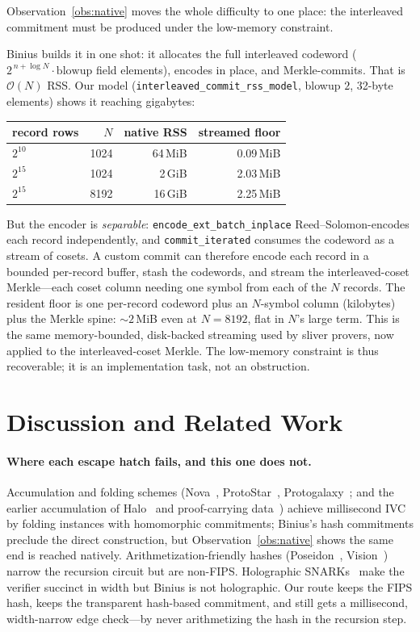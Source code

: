 \documentclass[11pt]{article}
\newcommand{\bigO}{\mathcal{O}}
\begin{document}
Observation~\ref{obs:native} moves the whole difficulty to one place: the
interleaved commitment must be produced under the low-memory constraint.

Binius builds it in one shot: it allocates the full interleaved codeword
($2^{\,n+\log N}\!\cdot\!\text{blowup}$ field elements), encodes in place, and
Merkle-commits. That is $\bigO(N)$ RSS. Our model
(\texttt{interleaved\_commit\_rss\_model}, blowup $2$, 32-byte elements) shows it
reaching gigabytes:

\begin{center}
\begin{tabular}{lrrr}
\toprule
record rows & $N$ & native RSS & streamed floor\\
\midrule
$2^{10}$ & 1024 & 64\,MiB & 0.09\,MiB\\
$2^{15}$ & 1024 & 2\,GiB  & 2.03\,MiB\\
$2^{15}$ & 8192 & 16\,GiB & 2.25\,MiB\\
\bottomrule
\end{tabular}
\end{center}

But the encoder is \emph{separable}: \texttt{encode\_ext\_batch\_inplace}
Reed--Solomon-encodes each record independently, and \texttt{commit\_iterated}
consumes the codeword as a stream of cosets. A custom commit can therefore encode
each record in a bounded per-record buffer, stash the codewords, and stream the
interleaved-coset Merkle---each coset column needing one symbol from each of the
$N$ records. The resident floor is one per-record codeword plus an $N$-symbol
column (kilobytes) plus the Merkle spine: $\sim2$\,MiB even at $N=8192$, flat in
$N$'s large term. This is the same memory-bounded, disk-backed streaming used by
sliver provers, now applied to the interleaved-coset Merkle. The low-memory
constraint is thus recoverable; it is an implementation task, not an obstruction.

\section{Discussion and Related Work}

\paragraph{Where each escape hatch fails, and this one does not.}
Accumulation and folding schemes (Nova~\cite{nova}, ProtoStar~\cite{protostar},
Protogalaxy~\cite{protogalaxy}; and the earlier accumulation of
Halo~\cite{halo} and proof-carrying data~\cite{pcdaccum}) achieve millisecond IVC
by folding instances with homomorphic commitments; Binius's hash commitments
preclude the direct construction, but Observation~\ref{obs:native} shows the same
end is reached natively. Arithmetization-friendly hashes
(Poseidon~\cite{poseidon}, Vision~\cite{marvellous}) narrow the recursion circuit
but are non-FIPS. Holographic SNARKs~\cite{marlin} make the verifier succinct in
width but Binius is not holographic. Our route keeps the FIPS hash, keeps the
transparent hash-based commitment, and still gets a millisecond, width-narrow
edge check---by never arithmetizing the hash in the recursion step.
\end{document}
